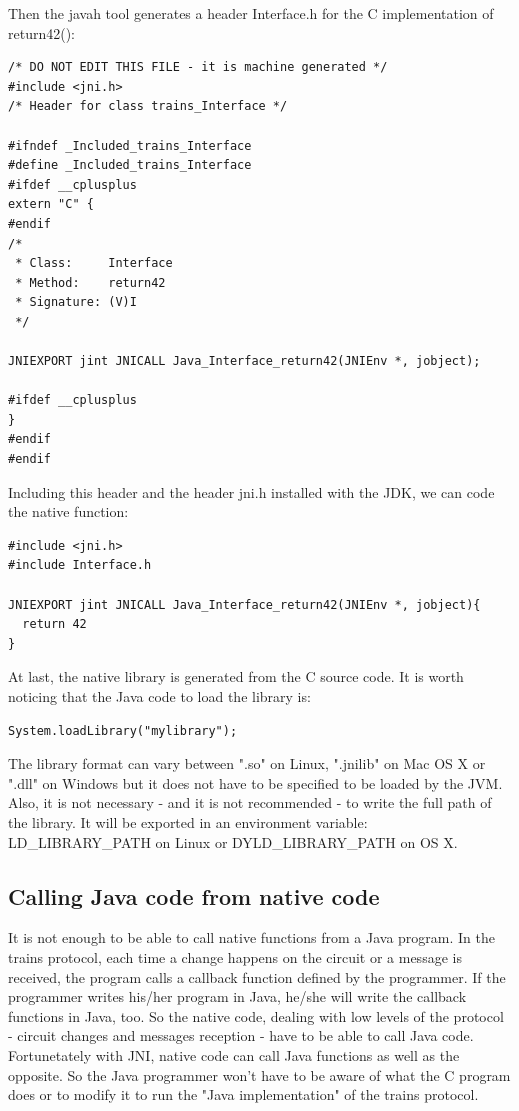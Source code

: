 \documentclass[a4paper,10pt]{report}
\begin{document}
Then the javah tool generates a header Interface.h for the C implementation of return42():\\
\lstset{language=C}
\lstset{commentstyle=\textit} 
\begin{lstlisting}
/* DO NOT EDIT THIS FILE - it is machine generated */
#include <jni.h>
/* Header for class trains_Interface */

#ifndef _Included_trains_Interface
#define _Included_trains_Interface
#ifdef __cplusplus
extern "C" {
#endif
/*
 * Class:     Interface
 * Method:    return42
 * Signature: (V)I
 */

JNIEXPORT jint JNICALL Java_Interface_return42(JNIEnv *, jobject);

#ifdef __cplusplus
}
#endif
#endif
\end{lstlisting}

Including this header and the header jni.h installed with the JDK, we can code the native function:\\

\lstset{language=C}
\lstset{commentstyle=\textit} 
\begin{lstlisting}
#include <jni.h>
#include Interface.h

JNIEXPORT jint JNICALL Java_Interface_return42(JNIEnv *, jobject){
  return 42
}

\end{lstlisting}

At last, the native library is generated from the C source code. It is worth noticing that the Java code to load the library is: \\
\lstset{language=java}
\lstset{commentstyle=\textit} 
\begin{lstlisting}
System.loadLibrary("mylibrary");
\end{lstlisting}

The library format can vary between ".so" on Linux, ".jnilib" on Mac OS X or ".dll" on Windows but it does not have to be specified to be loaded by the JVM.
Also, it is not necessary - and it is not recommended - to write the full path of the library. It will be exported in an environment variable: LD\_LIBRARY\_PATH on Linux or
DYLD\_LIBRARY\_PATH on OS X.

\subsection{Calling Java code from native code}

It is not enough to be able to call native functions from a Java program. In the trains protocol, each time a change happens on the circuit
or a message is received, the program calls a callback function defined by the programmer.
If the programmer writes his/her program in Java, he/she will write the callback functions in Java, too. So the native code, dealing with
low levels of the protocol - circuit changes and messages reception - have to be able to call Java code.
Fortunetately with JNI, native code can call Java functions as well as the opposite. So the Java programmer won't have to be aware of
what the C program does or to modify it to run the "Java implementation" of the trains protocol.  
\end{document}
